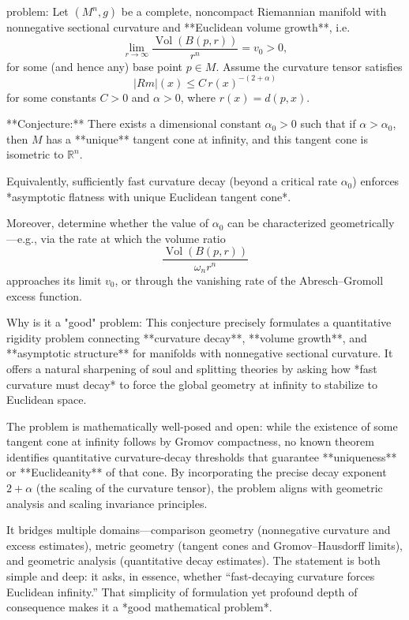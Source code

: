 problem:  
Let \((M^n, g)\) be a complete, noncompact Riemannian manifold with nonnegative sectional curvature and **Euclidean volume growth**, i.e.  
\[
\lim_{r\to \infty} \frac{\operatorname{Vol}(B(p, r))}{r^n} = v_0 > 0,
\]
for some (and hence any) base point \(p\in M\).  
Assume the curvature tensor satisfies
\[
|Rm|(x) \le C\, r(x)^{-(2+\alpha)}
\]
for some constants \(C>0\) and \(\alpha>0\), where \(r(x)=d(p, x)\).  

**Conjecture:**  
There exists a dimensional constant \(\alpha_0 > 0\) such that if \(\alpha > \alpha_0\), then \(M\) has a **unique** tangent cone at infinity, and this tangent cone is isometric to \(\mathbb{R}^n\).  

Equivalently, sufficiently fast curvature decay (beyond a critical rate \(\alpha_0\)) enforces *asymptotic flatness with unique Euclidean tangent cone*.  

Moreover, determine whether the value of \(\alpha_0\) can be characterized geometrically—e.g., via the rate at which the volume ratio  
\[
\frac{\operatorname{Vol}(B(p, r))}{\omega_n r^n}
\]
approaches its limit \(v_0\), or through the vanishing rate of the Abresch–Gromoll excess function.  

Why is it a "good" problem:  
This conjecture precisely formulates a quantitative rigidity problem connecting **curvature decay**, **volume growth**, and **asymptotic structure** for manifolds with nonnegative sectional curvature. It offers a natural sharpening of soul and splitting theories by asking how *fast curvature must decay* to force the global geometry at infinity to stabilize to Euclidean space.  

The problem is mathematically well-posed and open: while the existence of some tangent cone at infinity follows by Gromov compactness, no known theorem identifies quantitative curvature-decay thresholds that guarantee **uniqueness** or **Euclideanity** of that cone. By incorporating the precise decay exponent \(2+\alpha\) (the scaling of the curvature tensor), the problem aligns with geometric analysis and scaling invariance principles.  

It bridges multiple domains—comparison geometry (nonnegative curvature and excess estimates), metric geometry (tangent cones and Gromov–Hausdorff limits), and geometric analysis (quantitative decay estimates). The statement is both simple and deep: it asks, in essence, whether “fast-decaying curvature forces Euclidean infinity.” That simplicity of formulation yet profound depth of consequence makes it a *good mathematical problem*.